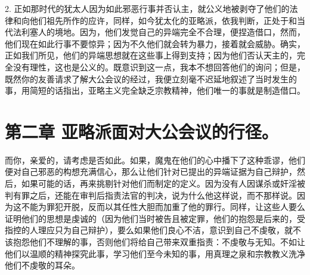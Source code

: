 2. 正如那时代的犹太人因为如此邪恶行事并否认主，就公义地被剥夺了他们的法律和向他们祖先所作的应许，同样，如今犹太化的亚略派，依我判断，正处于和当代法利塞人的境地。因为，他们发觉自己的异端完全不合理，便捏造借口，然而，他们现在如此行事不要惊异；因为不久他们就会转为暴力，接着就会威胁。确实，正如我们所见，他们的异端思想就在这些事上得到支持；因为他们否认天主的，完全没有理性，这也是公义的。既意识到这一点，我本不想回答他们的询问；但是，既然你的友善请求了解大公会议的经过，我便立刻毫不迟延地叙述了当时发生的事，用简短的话指出，亚略主义完全缺乏宗教精神，他们唯一的事就是制造借口。\par


\section{第二章 亚略派面对大公会议的行径。}

而你，亲爱的，请考虑是否如此。如果，魔鬼在他们的心中播下了这种乖谬，他们便对自己邪恶的构想充满信心，那么让他们针对已提出的异端证据为自己辩护，然后，如果可能的话，再来挑剔针对他们而制定的定义。因为没有人因谋杀或奸淫被判有罪之后，还能在审判后指责法官的判决，说为什么他这样说，而不那样说。因为这不能为罪犯开脱，反而以其任性大胆而加重了他的罪行。同样，让这些人要么证明他们的思想是虔诚的（因为他们当时被告且被定罪，他们的抱怨是后来的，受指控的人理应只为自己辩护），要么如果他们良心不洁，意识到自己不虔敬，就不该抱怨他们不理解的事，否则他们将给自己带来双重指责：不虔敬与无知。不如让他们以温顺的精神探究此事，学习他们至今未知的事，用真理之泉和宗教教义洗净他们不虔敬的耳朵。\par


